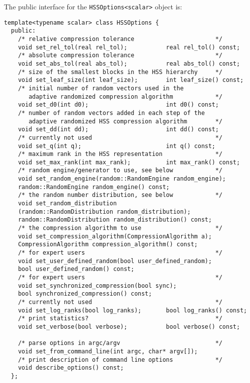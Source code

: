 \documentclass{article}
\begin{document}
The public interface for the \lstinline[style=C]!HSSOptions<scalar>!
object is:
\begin{lstlisting}[style=C]
  template<typename scalar> class HSSOptions {
  public:
    /* relative compression tolerance                       */
    void set_rel_tol(real rel_tol);           real rel_tol() const;
    /* absolute compression tolerance                       */
    void set_abs_tol(real abs_tol);           real abs_tol() const;
    /* size of the smallest blocks in the HSS hierarchy     */
    void set_leaf_size(int leaf_size);        int leaf_size() const;
    /* initial number of random vectors used in the
       adaptive randomized compression algorithm            */
    void set_d0(int d0);                      int d0() const;
    /* number of random vectors added in each step of the
       adaptive randomized HSS compression algorithm        */
    void set_dd(int dd);                      int dd() const;
    /* currently not used                                   */
    void set_q(int q);                        int q() const;
    /* maximum rank in the HSS representation               */
    void set_max_rank(int max_rank);          int max_rank() const;
    /* random engine/generator to use, see below            */
    void set_random_engine(random::RandomEngine random_engine);
    random::RandomEngine random_engine() const;
    /* the random number distribution, see below            */
    void set_random_distribution
    (random::RandomDistribution random_distribution);
    random::RandomDistribution random_distribution() const;
    /* the compression algorithm to use                     */
    void set_compression_algorithm(CompressionAlgorithm a);
    CompressionAlgorithm compression_algorithm() const;
    /* for expert users                                     */
    void set_user_defined_random(bool user_defined_random);
    bool user_defined_random() const;
    /* for expert users                                     */
    void set_synchronized_compression(bool sync);
    bool synchronized_compression() const;
    /* currently not used                                   */
    void set_log_ranks(bool log_ranks);       bool log_ranks() const;
    /* print statistics?                                    */
    void set_verbose(bool verbose);           bool verbose() const;

    /* parse options in argc/argv                           */
    void set_from_command_line(int argc, char* argv[]);
    /* print description of command line options            */
    void describe_options() const;
  };
\end{lstlisting}
\end{document}
